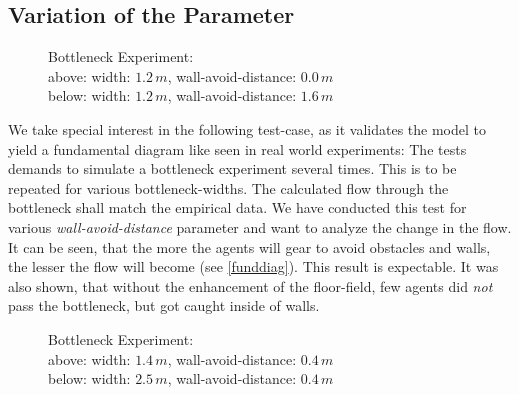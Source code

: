 \subsection{Variation of the Parameter}
\begin{figure}[h!]
\caption{Bottleneck Experiment:\\above: width: $1.2\,m$, wall-avoid-distance: $0.0\,m$\\below: width: $1.2\,m$, wall-avoid-distance: $1.6\,m$}
\label{varyWAD}
\end{figure}
We take special interest in the following test-case, as it validates the model to yield a fundamental diagram like seen in real world experiments:
The tests demands to simulate a bottleneck experiment several times. This is to be repeated for various bottleneck-widths. The calculated flow through the bottleneck shall match the empirical data.
We have conducted this test for various \emph{wall-avoid-distance} parameter and want to analyze the change in the flow. It can be seen, that the more the agents will gear to avoid obstacles and walls, the lesser the flow will become (see \ref{funddiag}). This result is expectable. It was also shown, that without the enhancement of the floor-field, few agents did \emph{not} pass the bottleneck, but got caught inside of walls.
\begin{figure}[h!]
\caption{Bottleneck Experiment:\\above: width: $1.4\,m$, wall-avoid-distance: $0.4\,m$\\below: width: $2.5\,m$, wall-avoid-distance: $0.4\,m$}
\label{varyWidth}
\end{figure}
%
%

